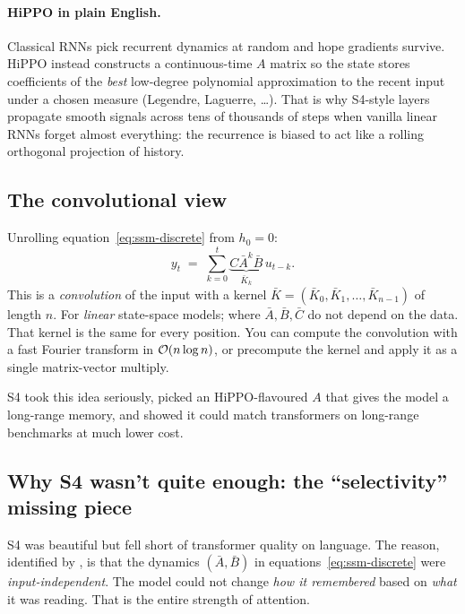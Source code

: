\paragraph{HiPPO in plain English.}
Classical RNNs pick recurrent dynamics at random and hope gradients
survive. HiPPO \citep{gu2020hippo} instead constructs a continuous-time
\(A\) matrix so the state stores coefficients of the \emph{best}
low-degree polynomial approximation to the recent input under a chosen
measure (Legendre, Laguerre, \ldots). That is why S4-style layers
\citep{gu2021s4} propagate smooth signals across tens of thousands of
steps when vanilla linear RNNs forget almost everything: the recurrence
is biased to act like a rolling orthogonal projection of history.

\subsection{The convolutional view}

Unrolling equation~\eqref{eq:ssm-discrete} from \(h_0 = 0\):
\begin{equation}
  y_t \;=\; \sum_{k=0}^{t} \underbrace{C \bar A^k \bar B}_{\bar K_k}\, u_{t-k}.
\end{equation}
This is a \emph{convolution} of the input with a kernel
\(\bar K = (\bar K_0, \bar K_1, \ldots, \bar K_{n-1})\) of length \(n\).
For \emph{linear} state-space models; where \(\bar A, \bar B, \bar C\) do
not depend on the data. That kernel is the same for every position. You
can compute the convolution with a fast Fourier transform in
\(\mathcal{O}(n \log n)\), or precompute the kernel and apply it as a single
matrix-vector multiply.

S4 \citep{gu2021s4} took this idea seriously, picked an HiPPO-flavoured
\(A\) that gives the model a long-range memory, and showed it could match
transformers on long-range benchmarks at much lower cost.

\subsection{Why S4 wasn't quite enough: the ``selectivity'' missing piece}

S4 was beautiful but fell short of transformer quality on language. The
reason, identified by \citet{gu2023mamba}, is that the dynamics
\((\bar A, \bar B)\) in equations~\eqref{eq:ssm-discrete} were
\emph{input-independent}. The model could not change \emph{how it
remembered} based on \emph{what} it was reading. That is the entire
strength of attention.

